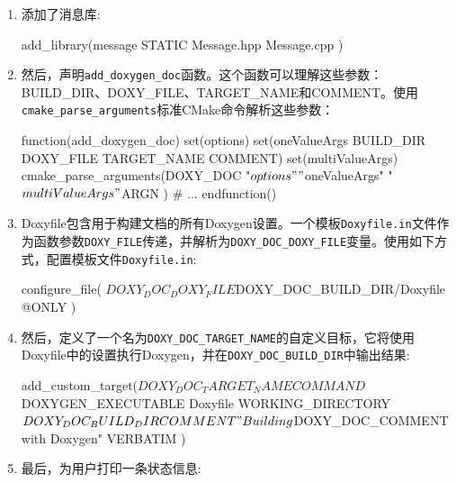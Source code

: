 \begin{enumerate}
\item 添加了消息库:

\begin{codebox}[cmake]
add_library(message STATIC
  Message.hpp
  Message.cpp
  )
\end{codebox}

\item 然后，声明\texttt{add\_doxygen\_doc}函数。这个函数可以理解这些参数：BUILD\_DIR、DOXY\_FILE、TARGET\_NAME和COMMENT。使用\texttt{cmake\_parse\_arguments}标准CMake命令解析这些参数：

\begin{codebox}[cmake]
function(add_doxygen_doc)
  set(options)
  set(oneValueArgs BUILD_DIR DOXY_FILE TARGET_NAME COMMENT)
  set(multiValueArgs)
  cmake_parse_arguments(DOXY_DOC
    "${options}"
    "${oneValueArgs}"
    "${multiValueArgs}"
    ${ARGN}
  )
  # ...
endfunction()
\end{codebox}

\item Doxyfile包含用于构建文档的所有Doxygen设置。一个模板\texttt{Doxyfile.in}文件作为函数参数\texttt{DOXY\_FILE}传递，并解析为\texttt{DOXY\_DOC\_DOXY\_FILE}变量。使用如下方式，配置模板文件\texttt{Doxyfile.in}:

\begin{codebox}[cmake]
configure_file(
  ${DOXY_DOC_DOXY_FILE}
  ${DOXY_DOC_BUILD_DIR}/Doxyfile
  @ONLY
  )
\end{codebox}

\item 然后，定义了一个名为\texttt{DOXY\_DOC\_TARGET\_NAME}的自定义目标，它将使用Doxyfile中的设置执行Doxygen，并在\texttt{DOXY\_DOC\_BUILD\_DIR}中输出结果:

\begin{codebox}[cmake]
add_custom_target(${DOXY_DOC_TARGET_NAME}
  COMMAND
    ${DOXYGEN_EXECUTABLE} Doxyfile
  WORKING_DIRECTORY
    ${DOXY_DOC_BUILD_DIR}
  COMMENT
    "Building ${DOXY_DOC_COMMENT} with Doxygen"
  VERBATIM
  )
\end{codebox}

\item 最后，为用户打印一条状态信息:


\end{enumerate}

